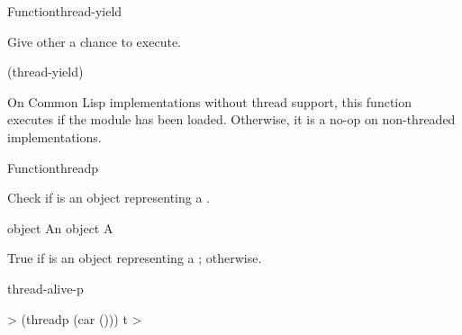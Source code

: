 \documentclass[10pt,twoside,english,pdftex]{article}
\begin{document}
\begin{functiondoc}{Function}{thread-yield}{\noargs{}}
%
%

\fnsyntax

\fnpurpose Give other  a chance to execute.

\fnpackage {}

\fnmodule {}

\fnexample
%
\W\supp
\begin{example}
  (thread-yield)
\end{example}

\fnnote On Common Lisp implementations without thread support, this function
executes  if the
 module has been loaded.  Otherwise, it is a
no-op on non-threaded implementations.

\end{functiondoc}


\begin{functiondoc}{Function}{threadp}{ 
    }
%

\fnsyntax

\fnpurpose Check if  is an object representing a
.

\fnpackage {}

\fnmodule {}

\fnargs
\begin{args}{object}
\arg[object] An object
\arg[boolean] A 
\end{args}

\fnreturns True if  is an object representing a 
; \nil{} otherwise.

\begin{alsos}{thread-alive-p}
\end{alsos}

%
\fnexample
%
\W\supp
\begin{example}
  > (threadp (car ()))
  t
  >
\end{example}

\end{functiondoc}
\end{document}
